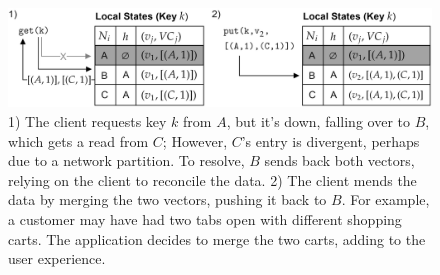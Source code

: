 \vspace{-1em}
\begin{figure}[ht!]
        
            \centering
            \includegraphics[width=.95\textwidth]{Sections/dyn/vc_3.png}
            \caption{ 1) The client requests key $k$ from $A$, but it's down, falling over to $B$, which gets a read from $C$;
            However, $C$'s entry is divergent, perhaps due to a network partition. To resolve, $B$ sends back both vectors, relying on the client to reconcile the data. 2) The client mends the data by merging the two vectors, pushing it 
            back to $B$. For example, a customer may have had two tabs open with different shopping carts. The application decides to merge the two carts, adding to the user experience.}
            \label{fig:vc_3}
\end{figure}


